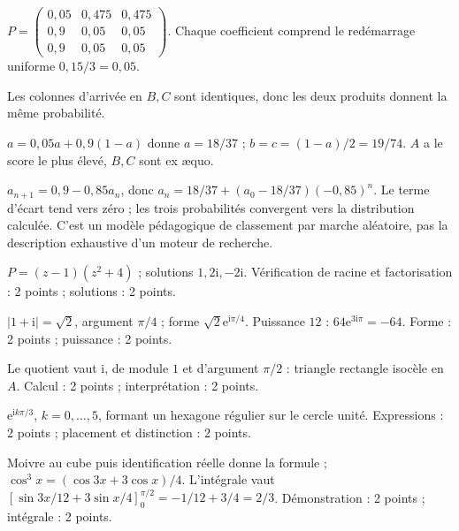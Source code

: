 \begin{questions}
\item $P=\begin{pmatrix}0{,}05&0{,}475&0{,}475\\0{,}9&0{,}05&0{,}05\\0{,}9&0{,}05&0{,}05\end{pmatrix}$. Chaque coefficient comprend le redémarrage uniforme $0{,}15/3=0{,}05$.
\item Les colonnes d’arrivée en $B,C$ sont identiques, donc les deux produits donnent la même probabilité.
\item $a=0{,}05a+0{,}9(1-a)$ donne $a=18/37$ ; $b=c=(1-a)/2=19/74$. $A$ a le score le plus élevé, $B,C$ sont ex æquo.
\item $a_{n+1}=0{,}9-0{,}85a_n$, donc $a_n=18/37+(a_0-18/37)(-0{,}85)^n$. Le terme d’écart tend vers zéro ; les trois probabilités convergent vers la distribution calculée. C’est un modèle pédagogique de classement par marche aléatoire, pas la description exhaustive d’un moteur de recherche.
\end{questions}
\par\addvspace{6mm}\label{evaluation-cor-1}
\begin{questions}
\item $P=(z-1)(z^2+4)$ ; solutions $1,2\mathrm i,-2\mathrm i$. Vérification de racine et factorisation : 2 points ; solutions : 2 points.
\item $|1+\mathrm i|=\sqrt2$, argument $\pi/4$ ; forme $\sqrt2\mathrm e^{\mathrm i\pi/4}$. Puissance $12$ : $64\mathrm e^{3\mathrm i\pi}=-64$. Forme : 2 points ; puissance : 2 points.
\item Le quotient vaut $\mathrm i$, de module $1$ et d’argument $\pi/2$ : triangle rectangle isocèle en $A$. Calcul : 2 points ; interprétation : 2 points.
\item $\mathrm e^{\mathrm ik\pi/3}$, $k=0,\ldots,5$, formant un hexagone régulier sur le cercle unité. Expressions : 2 points ; placement et distinction : 2 points.
\item Moivre au cube puis identification réelle donne la formule ; $\cos^3x=(\cos3x+3\cos x)/4$. L’intégrale vaut $[\sin3x/12+3\sin x/4]_0^{\pi/2}=-1/12+3/4=2/3$. Démonstration : 2 points ; intégrale : 2 points.
\end{questions}
